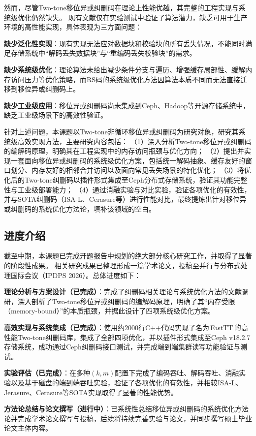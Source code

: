 然而，尽管Two-tone移位异或纠删码在理论上性能优越，其完整的工程实现与系统级优化仍然缺失。
现有文献仅在实验测试中验证了算法潜力，缺乏可用于生产环境的高性能实现，具体表现为三方面问题：

\begin{semiQuotList}
    \item \textbf{缺少泛化性实现}：现有实现无法应对数据块和校验块的所有丢失情况，不能同时满足存储系统中“解码丢失数据块”与“重编码丢失校验块”的需求。
    \item \textbf{缺少系统级优化}：理论算法未给出减少条件分支与遍历、增强缓存局部性、缓解内存访问压力等优化策略，而RS码的系统级优化方法因算法本质不同而无法直接迁移到移位异或纠删码上。
    \item \textbf{缺少工业级应用}：移位异或纠删码尚未集成到Ceph、Hadoop等开源存储系统中，缺乏工业级场景下的高效性验证。
\end{semiQuotList}

针对上述问题，本课题以Two-tone非循环移位异或纠删码为研究对象，研究其系统级高效实现方法，主要研究内容包括：
（1）深入分析Two-tone移位异或纠删码的编解码原理，明确其在工程实现中的内存访问瓶颈与优化方向；
（2）提出并实现一套面向移位异或纠删码的系统级优化方案，包括统一解码抽象、缓存友好的窗口划分、内存友好的相邻合并访问以及面向常见丢失场景的特化优化；
（3）将优化后的Two-tone纠删码以插件形式集成至Ceph分布式存储系统，验证其功能完整性与工业级部署能力；
（4）通过消融实验与对比实验，验证各项优化的有效性，并与SOTA纠删码（ISA-L、Cerasure等）进行性能对比，最终提炼出针对移位异或纠删码的系统优化方法论，填补该领域的空白。

\subsection{进度介绍}

截至中期，本课题已完成开题报告中规划的绝大部分核心研究工作，并取得了显著的阶段性成果。
相关研究成果已整理形成一篇学术论文，投稿至并行与分布式处理国际会议（IPDPS 2026）。总体进度如下：

\begin{semiQuotList}
    \item \textbf{理论分析与方案设计（已完成）}：完成了纠删码相关理论与系统优化方法的文献调研，深入剖析了Two-tone移位异或纠删码的编解码原理，明确了其“内存受限（memory-bound）”的本质瓶颈，并据此设计了四项系统级优化方案。
    \item \textbf{高效实现与系统集成（已完成）}：使用约2000行C++代码实现了名为\,FastTT\,的高性能Two-tone纠删码库，集成了全部四项优化，并以插件形式集成至Ceph v18.2.7存储系统，成功通过Ceph纠删码接口测试，并完成端到端集群读写功能验证与测试。
    \item \textbf{实验评估（已完成）}：在多种$(k,m)$配置下完成了编码吞吐、解码吞吐、消融实验以及基于磁盘的端到端吞吐实验，验证了各项优化的有效性，并相较ISA-L、Jerasure、Cerasure等SOTA实现取得了显著的性能优势。
    \item \textbf{方法论总结与论文撰写（进行中）}：已系统性总结移位异或纠删码的系统优化方法论并完成学术论文撰写与投稿，后续将持续完善实验与论文，并同步撰写硕士毕业论文主体内容。
\end{semiQuotList}

